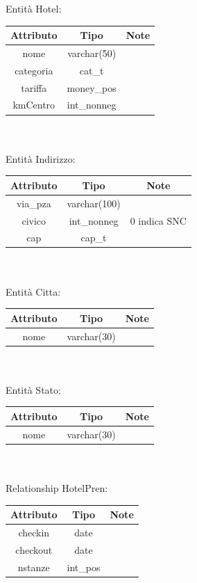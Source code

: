 \documentclass[a4paper,12pt]{report}
\begin{document}
      \hspace*{-0.75cm}
      Entità Hotel: \\
      \begin{tabular}{|c|c|c|}
        \hline Attributo & Tipo & Note \\
        \hline nome & varchar(50) & \\
        \hline categoria & cat\_t & \\
        \hline tariffa & money\_pos & \\
        \hline kmCentro & int\_nonneg & \\
        \hline
      \end{tabular} \\ \\
      Entità Indirizzo: \\
      \begin{tabular}{|c|c|c|}
        \hline Attributo & Tipo & Note \\
        \hline via\_pza & varchar(100) & \\
        \hline civico & int\_nonneg & 0 indica SNC \\
        \hline cap & cap\_t & \\
        \hline
      \end{tabular} \\ \\
      Entità Citta: \\
      \begin{tabular}{|c|c|c|}
        \hline Attributo & Tipo & Note \\
        \hline nome & varchar(30) & \\
        \hline
      \end{tabular} \\ \\
      Entità Stato: \\
      \begin{tabular}{|c|c|c|}
        \hline Attributo & Tipo & Note \\
        \hline nome & varchar(30) & \\
        \hline
      \end{tabular} \\ \\
      Relationship HotelPren: \\
      \begin{tabular}{|c|c|c|}
        \hline Attributo & Tipo & Note \\
        \hline checkin & date & \\
        \hline checkout & date & \\
        \hline nstanze & int\_pos & \\
        \hline
      \end{tabular} \\
\end{document}
